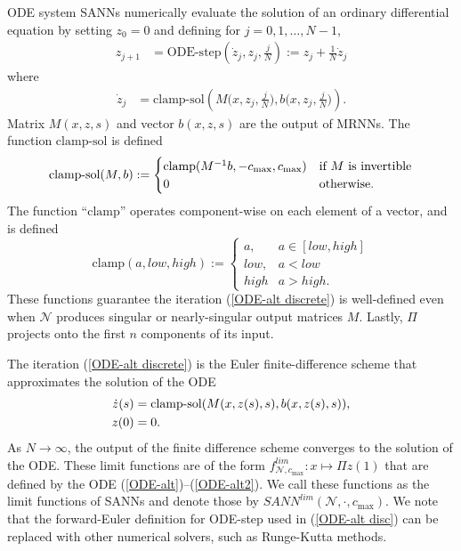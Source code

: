 \documentclass[final]{beamer}
\newcommand{\defeq}{:=}
\newlength{\mcolwidth}
\begin{document}
\begin{frame}[t]
\begin{columns}[t]
\begin{column}{\mcolwidth}
\begin{block}{ODE system}
    SANNs numerically evaluate the solution of an
    ordinary differential equation
    by setting $z_0=0$ and defining 
    for $j=0,1,\dots,N-1$,
    \begin{align}\label{ODE-alt disc}
        z_{j+1} &= \textrm{ODE-step}\left(\dot{z}_j, z_j, \frac{j}{N} \right) \defeq z_j +\frac{1}{N} \dot{z}_j
    \end{align} 
    where
    \begin{align}
        \dot z_j&=\textrm{clamp-sol} \left( M \Big(x,z_j,\frac jN \Big), b\Big(x,z_j,\frac jN \Big) \right). \label{ODE-alt discrete}
    \end{align}
    Matrix $M(x,z,s)$ and vector $b(x,z,s)$ are the output of MRNNs. The function $\textrm{clamp-sol}$ is defined 
    \begin{equation}
    \textrm{clamp-sol}(M,b) \defeq \begin{cases}
            \hbox{clamp}(M^{-1}b,-c_{\max},c_{\max}) & \text{if $M$ is invertible} \\
            0 & \text{otherwise.}
        \end{cases}
    \end{equation}
    The function ``$\textrm{clamp}$'' operates component-wise on each element of a vector, and is defined
    \begin{equation}
        \textrm{clamp}(a, low, high) \defeq \begin{cases} a, & a \in [low, high] \\
        low, & a < low \\
        high & a > high.
        \end{cases}
    \end{equation}
    These functions guarantee the iteration (\ref{ODE-alt discrete}) is well-defined even when $\mathcal{N}$ produces singular or nearly-singular output matrices $M$. 
    Lastly, $\Pi$ projects onto the first $n$ components of its input.

    The iteration (\ref{ODE-alt discrete})
    is the  Euler finite-difference scheme that approximates 
    the solution of the ODE
    \begin{align}
        \dot z(s)&=\hbox{clamp-sol}(M(x,z(s),s),b(x,z(s),s)), \label{ODE-alt} \\
        z(0)&=0. \label{ODE-alt2}
    \end{align}
    As $N\to \infty$, the output of the finite difference scheme converges
    to the solution of the ODE.
    These limit functions are of the form $f^{lim}_{\mathcal{N},c_{\text{max}}}:x\mapsto \Pi z(1)$ that are defined
    by the ODE (\ref{ODE-alt})--(\ref{ODE-alt2}). We call these functions as the limit functions of 
    SANNs and denote those by $SANN^{lim}(\mathcal{N}, \cdot, c_{\max})$.
    We note that the forward-Euler definition for ODE-step used in (\ref{ODE-alt disc}) can be replaced with other numerical solvers, such as Runge-Kutta methods.


\end{block}
\end{column}
\end{columns}
\end{frame}
\end{document}
